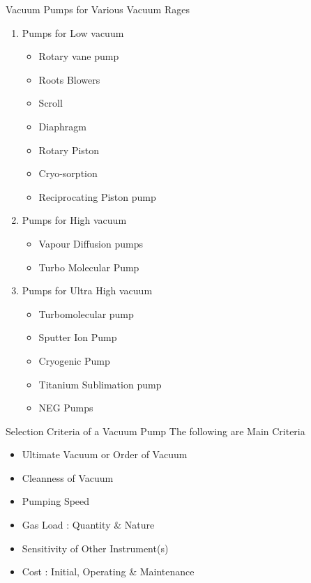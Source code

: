 \documentclass[11]{beamer}
\begin{document}
\begin{frame}{Vacuum Pumps for Various Vacuum Rages}

\begin{enumerate}
\item Pumps for Low vacuum
	\begin{itemize}
	\item Rotary vane pump
    \item    Roots Blowers
     \item   Scroll
      \item  Diaphragm
      \item  Rotary Piston
      \item  Cryo-sorption
     \item   Reciprocating Piston pump
	\end{itemize}
	
\item Pumps for High vacuum
        
        \begin{itemize}
			\item Vapour Diffusion pumps	
    		\item    Turbo Molecular Pump
	    \end{itemize}
	
\item Pumps for Ultra High vacuum
        
        \begin{itemize}
			\item Turbomolecular pump
      		\item 	 Sputter Ion Pump
       		\item 		Cryogenic Pump
       		\item 		Titanium Sublimation pump
       		\item 		NEG Pumps
    		   
	    \end{itemize}


\end{enumerate}


\end{frame}

\begin{frame}{Selection Criteria of a Vacuum Pump}
The following are Main Criteria
\begin{itemize}
 \item Ultimate Vacuum or Order of Vacuum
 \item  Cleanness of Vacuum
 \item Pumping Speed 
 \item Gas Load : Quantity \& Nature
 \item Sensitivity of  Other Instrument(s) 
 \item Cost : Initial, Operating \& Maintenance
\end{itemize}

\end{frame}
\end{document}
